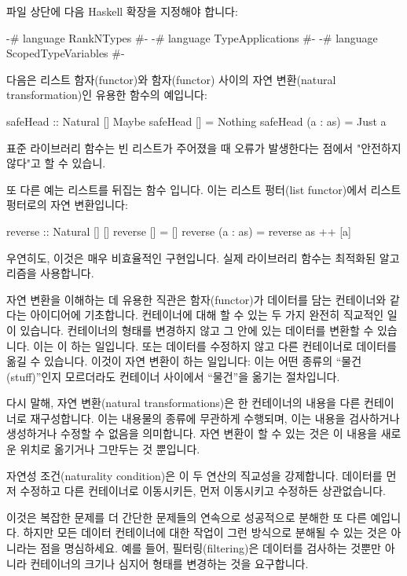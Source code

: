 \documentclass[DaoFP]{subfiles}
\begin{document}
파일 상단에 다음 Haskell 확장을 지정해야 합니다:
\begin{haskell}
{-# language RankNTypes #-}
{-# language TypeApplications #-}
{-# language ScopedTypeVariables #-}
\end{haskell}

다음은 리스트 함자(functor)와  함자(functor) 사이의 자연 변환(natural transformation)인 유용한 함수의 예입니다:
\begin{haskell}
safeHead :: Natural [] Maybe
safeHead [] = Nothing
safeHead (a : as) = Just a
\end{haskell}
표준 라이브러리  함수는 빈 리스트가 주어졌을 때 오류가 발생한다는 점에서 "안전하지 않다"고 할 수 있습니.

또 다른 예는 리스트를 뒤집는 함수 입니다. 이는 리스트 펑터(list functor)에서 리스트 펑터로의 자연 변환입니다:
\begin{haskell}
reverse :: Natural [] []
reverse [] = []
reverse (a : as) = reverse as ++ [a]
\end{haskell}
우연히도, 이것은 매우 비효율적인 구현입니다. 실제 라이브러리 함수는 최적화된 알고리즘을 사용합니다.

자연 변환을 이해하는 데 유용한 직관은 함자(functor)가 데이터를 담는 컨테이너와 같다는 아이디어에 기초합니다. 컨테이너에 대해 할 수 있는 두 가지 완전히 직교적인 일이 있습니다. 컨테이너의 형태를 변경하지 않고 그 안에 있는 데이터를 변환할 수 있습니다. 이는 이 하는 일입니다. 또는 데이터를 수정하지 않고 다른 컨테이너로 데이터를 옮길 수 있습니다. 이것이 자연 변환이 하는 일입니다: 이는 어떤 종류의 ``물건(stuff)''인지 모르더라도 컨테이너 사이에서 ``물건''을 옮기는 절차입니다.

다시 말해, 자연 변환(natural transformations)은 한 컨테이너의 내용을 다른 컨테이너로 재구성합니다. 이는 내용물의 종류에 무관하게 수행되며, 이는 내용을 검사하거나 생성하거나 수정할 수 없음을 의미합니다. 자연 변환이 할 수 있는 것은 이 내용을 새로운 위치로 옮기거나 그만두는 것 뿐입니다.

자연성 조건(naturality condition)은 이 두 연산의 직교성을 강제합니다. 데이터를 먼저 수정하고 다른 컨테이너로 이동시키든, 먼저 이동시키고 수정하든 상관없습니다.

이것은 복잡한 문제를 더 간단한 문제들의 연속으로 성공적으로 분해한 또 다른 예입니다. 하지만 모든 데이터 컨테이너에 대한 작업이 그런 방식으로 분해될 수 있는 것은 아니라는 점을 명심하세요. 예를 들어, 필터링(filtering)은 데이터를 검사하는 것뿐만 아니라 컨테이너의 크기나 심지어 형태를 변경하는 것을 요구합니다.
\end{document}
